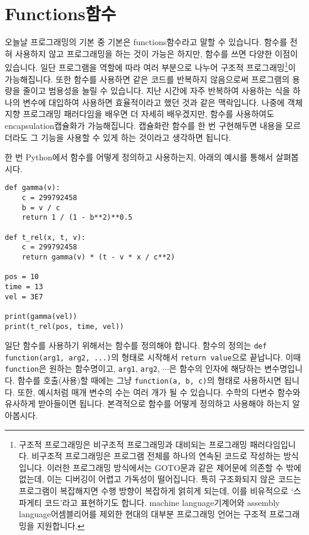 \documentclass[../main.tex]{subfiles}
\begin{document}
\section{Functions함수}
오늘날 프로그래밍의 기본 중 기본은 functions함수라고 말할 수 있습니다.  함수를
전혀 사용하지 않고 프로그래밍을 하는 것이 가능은 하지만, 함수를 쓰면 다양한
이점이 있습니다.  일단 프로그램을 역할에 따라 여러 부분으로 나누어 구조적
프로그래밍\footnote{구조적 프로그래밍은 비구조적 프로그래밍과 대비되는
프로그래밍 패러다임입니다. 비구조적 프로그래밍은 프로그램 전체를 하나의 연속된
코드로 작성하는 방식입니다. 이러한 프로그래밍 방식에서는 GOTO문과 같은 제어문에
의존할 수 밖에 없는데, 이는 디버깅이 어렵고 가독성이 떨어집니다. 특히
구조화되지 않은 코드는 프로그램이 복잡해지면 수행 방향이 복잡하게 얽히게
되는데, 이를 비유적으로 `스파게티 코드'라고 표현하기도 합니다. machine
language기계어와 assembly language어셈블리어를 제외한 현대의 대부분 프로그래밍
언어는 구조적 프로그래밍을 지원합니다.}이 가능해집니다.  또한 함수를 사용하면
같은 코드를 반복하지 않음으로써 프로그램의 용량을 줄이고 범용성을 늘릴 수
있습니다.  지난 시간에 자주 반복하여 사용하는 식을 하나의 변수에 대입하여
사용하면 효율적이라고 했던 것과 같은 맥락입니다.  나중에 객체 지향 프로그래밍
패러다임을 배우면 더 자세히 배우겠지만, 함수를 사용하여도 encapsulation캡슐화가
가능해집니다.  캡슐화란 함수를 한 번 구현해두면 내용을 모르더라도 그 기능을
사용할 수 있게 하는 것이라고 생각하면 됩니다.

한 번 Python에서 함수를 어떻게 정의하고 사용하는지, 아래의 예시를 통해서 살펴봅시다.
\begin{verbatim}
def gamma(v):
    c = 299792458
    b = v / c
    return 1 / (1 - b**2)**0.5

def t_rel(x, t, v):
    c = 299792458
    return gamma(v) * (t - v * x / c**2)

pos = 10
time = 13
vel = 3E7

print(gamma(vel))
print(t_rel(pos, time, vel))
\end{verbatim}
일단 함수를 사용하기 위해서는 함수를 정의해야 합니다.
함수의 정의는 \texttt{def function(arg1, arg2, ...)}의 형태로 시작해서
\texttt{return value}으로 끝납니다. 이때 \verb|function|은 원하는 함수명이고,
\verb|arg1|, \verb|arg2|, $\cdots$은 함수의 인자에 해당하는 변수명입니다.
함수를 호출(사용)할 때에는 그냥 \texttt{function(a, b, c)}의 형태로 사용하시면
됩니다.
또한, 예시처럼 매개 변수의 수는 여러 개가 될 수 있습니다.
수학의 다변수 함수와 유사하게 받아들이면 됩니다.
본격적으로 함수를 어떻게 정의하고 사용해야 하는지 알아봅시다.
\end{document}
